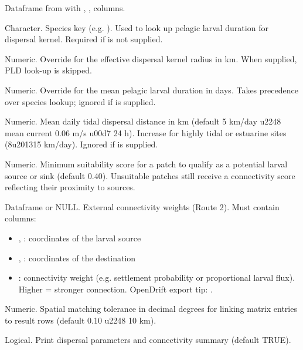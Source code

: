 \documentclass[a4paper]{book}
\begin{document}
\begin{Arguments}
\begin{ldescription}
\item[\code{result}] Dataframe from  with , ,
 columns.

\item[\code{species}] Character. Species key (e.g. ). Used to
look up pelagic larval duration for dispersal kernel. Required if
 is not supplied.

\item[\code{dispersal\_km}] Numeric. Override for the effective dispersal kernel
radius in km. When supplied,  PLD look-up is skipped.

\item[\code{pld\_days}] Numeric. Override for the mean pelagic larval duration in
days. Takes precedence over species lookup; ignored if  is
supplied.

\item[\code{tidal\_excursion\_km}] Numeric. Mean daily tidal dispersal distance in km
(default 5 km/day \bsl{}u2248 mean current 0.06 m/s \bsl{}u00d7 24 h). Increase for highly
tidal or estuarine sites (8\bsl{}u201315 km/day). Ignored if  is
supplied.

\item[\code{min\_suitability}] Numeric. Minimum suitability score for a patch to
qualify as a potential larval source or sink (default 0.40). Unsuitable
patches still receive a connectivity score reflecting their proximity to
sources.

\item[\code{connectivity\_matrix}] Dataframe or NULL. External connectivity weights
(Route 2). Must contain columns:
\begin{itemize}

\item{} , : coordinates of the larval source
\item{} , : coordinates of the destination
\item{} : connectivity weight  (e.g. settlement probability or
proportional larval flux). Higher = stronger connection.
OpenDrift export tip: .

\end{itemize}


\item[\code{matrix\_match\_radius\_deg}] Numeric. Spatial matching tolerance in decimal
degrees for linking matrix entries to result rows (default 0.10 \bsl{}u2248 10 km).

\item[\code{verbose}] Logical. Print dispersal parameters and connectivity summary
(default TRUE).
\end{ldescription}
\end{Arguments}
\end{document}
